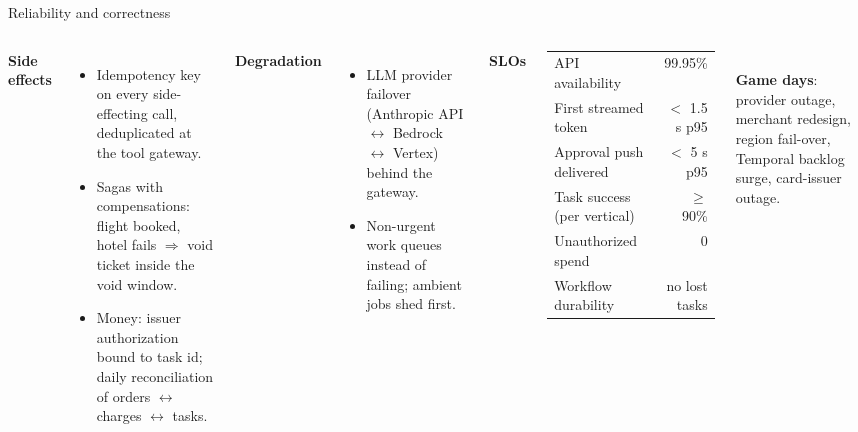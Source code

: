 \documentclass[aspectratio=169,10pt]{beamer}
\begin{document}
\begin{frame}{Reliability and correctness}
\begin{columns}[T]
\small
\textbf{Side effects}
\begin{itemize}
  \item Idempotency key on every side-effecting call, deduplicated at the tool gateway.
  \item Sagas with compensations: flight booked, hotel fails $\Rightarrow$ void ticket inside the void window.
  \item Money: issuer authorization bound to task id; daily reconciliation of orders $\leftrightarrow$ charges $\leftrightarrow$ tasks.
\end{itemize}
\textbf{Degradation}
\begin{itemize}
  \item LLM provider failover (Anthropic API $\leftrightarrow$ Bedrock $\leftrightarrow$ Vertex) behind the gateway.
  \item Non-urgent work queues instead of failing; ambient jobs shed first.
\end{itemize}
\small
\textbf{SLOs}\\[2pt]
\scriptsize
\begin{tabular}{l r}
\toprule
API availability & 99.95\%\\
First streamed token & $<$ 1.5 s p95\\
Approval push delivered & $<$ 5 s p95\\
Task success (per vertical) & $\ge$ 90\%\\
Unauthorized spend & 0\\
Workflow durability & no lost tasks\\
\bottomrule
\end{tabular}\\[6pt]
\small
\textbf{Game days}: provider outage, merchant redesign, region fail-over, Temporal backlog surge, card-issuer outage.
\end{columns}
\end{frame}
\end{document}
